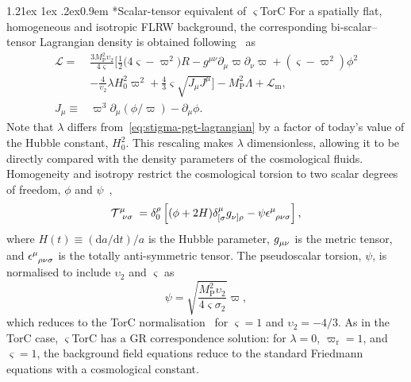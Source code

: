 \documentclass[aps,prd,reprint,preprintnumbers,showpacs,floatfix,nofootinbib,superscriptaddress]{revtex4-2}
\makeatletter
\renewcommand{\paragraph}{%
\@startsection{paragraph}{4}%
{\z@}{1.21ex \@plus 1ex \@minus .2ex}{0.9em}%
{\normalfont\normalsize\bfseries}%
}
\newcommand{\Mp}{M_\mathrm{P}^2}
\newcommand{\TT}{\mathcal{T}}
\newcommand{\cpr}{\varpi}
\newcommand{\cprr}{\varpi_\mathrm{r}}
\makeatother
\begin{document}
\paragraph*{Scalar-tensor equivalent of $\varsigma$TorC} For a spatially flat, homogeneous and isotropic FLRW background, the corresponding bi-scalar--tensor Lagrangian density is obtained following~\citep{Barker:2020elg} as
\begin{equation}
\begin{aligned}
		\mathcal{L} = {}& \frac{3 \Mp \upsilon_2}{4 \varsigma}\Big[ \frac{1}{2} \big( 4 \varsigma - \cpr^2\big) R - g^{\mu\nu}\partial_\mu \cpr \partial_\nu \cpr + (\varsigma - \cpr^2) \phi^2 \\
		& - \frac{4}{\upsilon_2}\lambda H_0^2\cpr^2 + \frac{4}{3}\varsigma \sqrt{J_\mu J^\mu} \Big] - \Mp \Lambda + \mathcal{L}_\mathrm{m},\\
  J_\mu \equiv {}& \cpr^3 \partial_\mu (\phi/\cpr) - \partial_\mu \phi.
  \label{eq:stigma-lagrangian}
\end{aligned}
\end{equation}
Note that $\lambda$ differs from~\cref{eq:stigma-pgt-lagrangian} by a factor of today's value of the Hubble constant, $H_0^2$. This rescaling makes $\lambda$ dimensionless, allowing it to be directly compared with the density parameters of the cosmological fluids. Homogeneity and isotropy restrict the cosmological torsion to two scalar degrees of freedom, $\phi$ and $\psi$~\citep{TSAMPARLIS197927},
\begin{equation}
\tensor{\TT}{^\mu_{\nu\sigma}} = \tensor*{\delta}{^\rho_0} \left[ (\phi + 2H)\tensor*{\delta}{^\mu_{[\sigma}}\tensor{g}{_{\nu]\rho}} - \psi \tensor{\epsilon}{^\mu_{\rho\nu\sigma}} \right],
\label{eq:torsionscalars}
\end{equation}
where $H(t) \equiv (\mathrm{d}a/\mathrm{d}t)/a$ is the Hubble parameter, $\tensor{g}{_\mu_\nu}$ is the metric tensor, and $\tensor{\epsilon}{^\mu_{\rho\nu\sigma}}$ is the totally anti-symmetric tensor. The pseudoscalar torsion, $\psi$, is normalised to include $\upsilon_2$ and $\varsigma$ as
\begin{equation}
\psi = \sqrt{\frac{\Mp \upsilon_2}{4 \varsigma \sigma_2}}\cpr,
\end{equation}
which reduces to the TorC normalisation~\citep{Legner:2025hrt} for $\varsigma=1$ and $\upsilon_2=-4/3$. As in the TorC case, $\varsigma$TorC has a GR correspondence solution: for $\lambda=0$, $\cprr=1$, and $\varsigma=1$, the background field equations reduce to the standard Friedmann equations with a cosmological constant.
\end{document}
